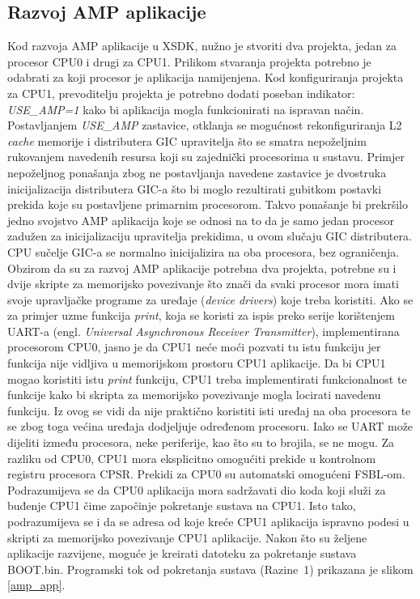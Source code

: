 \documentclass[times, utf8, diplomski, numeric]{fer}
\begin{document}
\subsection{Razvoj AMP aplikacije}
Kod razvoja AMP aplikacije u XSDK, nužno je stvoriti dva projekta, jedan za procesor CPU0 i drugi za CPU1.
Prilikom stvaranja projekta potrebno je odabrati za koji procesor je aplikacija namijenjena. Kod konfiguriranja
projekta za CPU1, prevoditelju projekta je potrebno dodati poseban indikator: \textit{USE\_AMP=1} kako bi aplikacija mogla
funkcionirati na ispravan način. Postavljanjem \textit{USE\_AMP} zastavice, otklanja se mogućnost rekonfiguriranja L2 \textit{cache}
memorije i distributera GIC upravitelja što se smatra nepoželjnim rukovanjem navedenih resursa koji su zajednički procesorima
u sustavu. Primjer nepoželjnog ponašanja zbog ne postavljanja navedene zastavice je dvostruka inicijalizacija distributera
GIC-a što bi moglo rezultirati gubitkom postavki prekida koje su postavljene primarnim procesorom. Takvo ponašanje bi
prekršilo jedno svojstvo AMP aplikacija koje se odnosi na to da je samo jedan procesor zadužen za inicijalizaciju upravitelja
prekidima, u ovom slučaju GIC distributera. CPU sučelje GIC-a se normalno inicijalizira na oba procesora, bez ograničenja.
Obzirom da su za razvoj AMP aplikacije potrebna dva projekta, potrebne su i dvije skripte za memorijsko povezivanje što
znači da svaki procesor mora imati svoje upravljačke programe za uređaje (\textit{device drivers}) koje treba koristiti.
Ako se za primjer uzme funkcija \textit{print}, koja se koristi za ispis preko serije korištenjem UART-a (engl. \textit{Universal
Asynchronous Receiver Transmitter}), implementirana procesorom CPU0, jasno je da CPU1 neće moći pozvati tu istu funkciju
jer funkcija nije vidljiva u memorijskom prostoru CPU1 aplikacije. Da bi CPU1 mogao koristiti istu \textit{print} funkciju,
CPU1 treba implementirati funkcionalnost te funkcije kako bi skripta za memorijsko povezivanje mogla locirati navedenu
funkciju. Iz ovog se vidi da nije praktično koristiti isti uređaj na oba procesora te se zbog toga većina uređaja dodjeljuje
određenom procesoru. Iako se UART može dijeliti između procesora, neke periferije, kao što su to brojila, se ne mogu.
Za razliku od CPU0, CPU1 mora eksplicitno omogućiti prekide u kontrolnom registru procesora CPSR. Prekidi za CPU0 su
automatski omogućeni FSBL-om. Podrazumijeva se da CPU0 aplikacija mora sadržavati dio koda koji služi za buđenje CPU1
čime započinje pokretanje sustava na CPU1. Isto tako, podrazumijeva se i da se adresa od koje kreće CPU1 aplikacija
ispravno podesi u skripti za memorijsko povezivanje CPU1 aplikacije. Nakon što su željene aplikacije razvijene, moguće
je kreirati datoteku za pokretanje sustava BOOT.bin. Programski tok od pokretanja sustava (Razine~1) prikazana je slikom
\ref{amp_app}.
\end{document}
